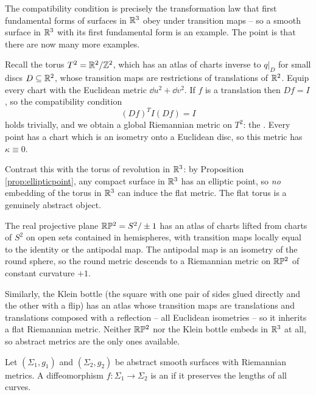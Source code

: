 \documentclass[a4paper]{scrartcl}
\begin{document}
The compatibility condition is precisely the transformation law that first fundamental forms of surfaces in $\mathbb{R}^3$ obey under transition maps -- so a smooth surface in $\mathbb{R}^3$ with its first fundamental form is an example. The point is that there are now many more examples.

\begin{example}\label{ex:flattorus}
    Recall the torus $T^2 = \mathbb{R}^2/\mathbb{Z}^2$, which has an atlas of charts inverse to $q|_{D}$ for small discs $D \subseteq \mathbb{R}^2$, whose transition maps are restrictions of translations of $\mathbb{R}^2$. Equip every chart with the Euclidean metric $\dd u^2 + \dd v^2$. If $f$ is a translation then $Df = I$, so the compatibility condition
    $$
    (Df)^T I (Df) = I
    $$
    holds trivially, and we obtain a global Riemannian metric on $T^2$: the . Every point has a chart which is an isometry onto a Euclidean disc, so this metric has $\kappa \equiv 0$.

    Contrast this with the torus of revolution in $\mathbb{R}^3$: by Proposition \ref{prop:ellipticpoint}, any compact surface in $\mathbb{R}^3$ has an elliptic point, so \emph{no} embedding of the torus in $\mathbb{R}^3$ can induce the flat metric. The flat torus is a genuinely abstract object.
\end{example}

\begin{example}
    The real projective plane $\mathbb{R}\mathbb{P}^2 = S^2/\pm 1$ has an atlas of charts lifted from charts of $S^2$ on open sets contained in hemispheres, with transition maps locally equal to the identity or the antipodal map. The antipodal map is an isometry of the round sphere, so the round metric descends to a Riemannian metric on $\mathbb{R}\mathbb{P}^2$ of constant curvature $+1$.

    Similarly, the Klein bottle (the square with one pair of sides glued directly and the other with a flip) has an atlas whose transition maps are translations and translations composed with a reflection -- all Euclidean isometries -- so it inherits a flat Riemannian metric. Neither $\mathbb{R}\mathbb{P}^2$ nor the Klein bottle embeds in $\mathbb{R}^3$ at all, so abstract metrics are the only ones available.
\end{example}

\begin{definition}
    Let $(\Sigma_1, g_1)$ and $(\Sigma_2, g_2)$ be abstract smooth surfaces with Riemannian metrics. A diffeomorphism $f: \Sigma_1 \rightarrow \Sigma_2$ is an  if it preserves the lengths of all curves.
\end{definition}
\end{document}
